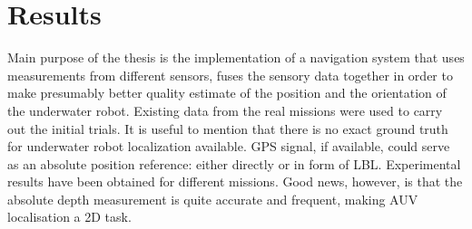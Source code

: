 \chapter{Results} \label{chap:results}
Main purpose of the thesis is the implementation of a navigation system that uses measurements from different sensors, fuses the sensory data together in order to make presumably better quality estimate of the position and the orientation of the underwater robot. Existing data from the real missions were used to carry out the initial trials. It is useful to mention that there is no exact ground truth for underwater robot localization available. GPS signal, if available, could serve as an absolute position reference: either directly or in form of LBL. Experimental results have been obtained for different missions. Good news, however, is that the absolute depth measurement is quite accurate and frequent, making AUV localisation a 2D task.  



